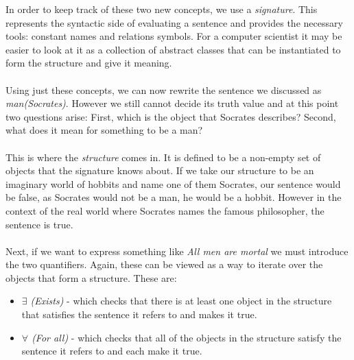 \documentclass{report}
\begin{document}
\noindent In order to keep track of these two new concepts, we use a \emph{
signature}. This represents the syntactic side of evaluating a sentence and 
provides the necessary tools: constant names and relations symbols. For a 
computer scientist it may be easier to look at it as a collection of abstract 
classes that can be instantiated to form the structure and give it meaning.
\\ \\
Using just these concepts, we can now rewrite the sentence we discussed as 
\emph{man(Socrates)}. However we still cannot decide its truth value and at this
point two questions arise: First, which is the object that Socrates describes?
Second, what does it mean for something to be a man?
\\ \\
This is where the \emph{structure} comes in. It is defined to be a non-empty set
of objects that the signature knows about. If we take our structure to be an
imaginary world of hobbits and name one of them Socrates, our sentence would be
false, as Socrates would not be a man, he would be a hobbit. However in the 
context of the real world where Socrates names the famous philosopher, the 
sentence is true. 
\\ \\
Next, if we want to express something like \emph{All men are mortal} we must 
introduce the two quantifiers. Again, these can be viewed as a way to iterate 
over the objects that form a structure. These are:

	\begin{itemize}
	\item \emph{$\exists$ (Exists)} 
  - which checks that there is at least one object in the structure that
  satisfies the sentence it refers to and makes it true.
	\item \emph{$\forall$ (For all)}
  - which checks that all of the objects in the structure satisfy the sentence 
  it refers to and each make it true.
	\end{itemize}
\end{document}
